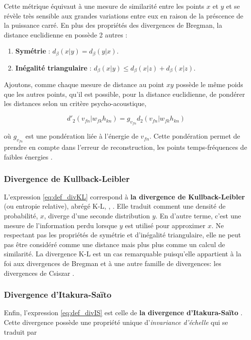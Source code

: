 Cette métrique équivaut à une mesure de similarité entre les points $x$ et $y$ et se révèle très sensible aux grandes variations entre eux en raison de la préscence de la puissance carré. En plus des propriétés des divergences de Bregman, la distance euclidienne en possède 2 autres : 
\begin{enumerate}

\item \textbf{Symétrie} : $d_{\beta}(x \vert y ) = d_{\beta}(y \vert x)$.

\item \textbf{Inégalité triangulaire} : $d_{\beta}(x \vert y ) \leq d_{\beta}(x \vert z ) + d_{\beta}(x \vert z )$.\\
\end{enumerate}

Ajoutons, comme chaque mesure de distance au point $xy$ possède le même poids que les autres points, qu'il est possible, pour la distance euclidienne, de pondérer les distances selon un critère psycho-acoustique, 

\begin{equation}
d'_2(v_{fn} \vert w_{fk} h_{kn}) = g_{v_{fn}} d_2 (v_{fn} \vert w_{fk} h_{kn})
\end{equation}

où $g_{v_{fn}}$ est une pondération liée à l'énergie de $v_{fn}$. Cette pondération permet de prendre en compte dans l'erreur de reconstruction, les points temps-fréquences de faibles énergies \cite{virtanen2004separation}. 

\subsubsection{Divergence de Kullback-Leibler}
L'expression \ref{eq:def_divKL} correspond à \textbf{la divergence de Kullback-Leibler} (ou entropie relative), abrégé K-L, \cite{kompass_generalized_2007}, \cite{cichocki_new_2006} . Elle traduit comment une densité de probabilité, $x$, diverge d'une seconde distribution $y$. En d'autre terme, c'est une mesure de l'information perdu lorsque $y$ est utilisé pour approximer $x$. Ne respectant pas les propriétés de symétrie et d'inégalité triangulaire, elle ne peut pas être considéré comme une distance mais plus plus comme un calcul de similarité. La divergence K-L est un cas remarquable puisqu'elle appartient à la foi aux divergences de Bregman et à une autre famille de divergences: les divergences de Csiszar \cite{cichocki_csiszars_2006}. 

\subsubsection{Divergence d'Itakura-Saïto}
Enfin, l'expression \ref{eq:def_divIS} est celle de \textbf{la divergence d'Itakura-Saïto} \cite{itakura1968analysis} \cite{bertin_les_2009}. Cette divergence possède une propriété unique d'\textit{invariance d'échelle} qui se traduit par 

